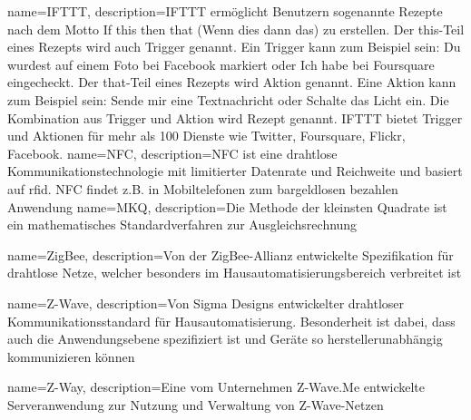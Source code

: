 
{
	name={IFTTT},
	description={IFTTT ermöglicht Benutzern sogenannte \glqq Rezepte\grqq{} nach dem Motto \glqq If this then that\grqq{} (\glqq Wenn dies dann das\grqq) zu erstellen. Der \glqq this\grqq -Teil eines Rezepts wird auch \glqq Trigger\grqq{} genannt. Ein Trigger kann zum Beispiel sein: \glqq Du wurdest auf einem Foto bei Facebook markiert\grqq{} oder \glqq Ich habe bei Foursquare eingecheckt\grqq . Der \glqq that\grqq -Teil eines Rezepts wird Aktion genannt. Eine Aktion kann zum Beispiel sein: \glqq Sende mir eine Textnachricht\grqq{} oder \glqq Schalte das Licht ein\grqq . Die Kombination aus Trigger und Aktion wird Rezept genannt. IFTTT bietet Trigger und Aktionen für mehr als 100 Dienste wie Twitter, Foursquare, Flickr, Facebook.}
}
{
	name={NFC},
	description={NFC ist eine drahtlose Kommunikationstechnologie mit limitierter Datenrate und Reichweite und basiert auf \gls{rfid}. NFC findet z.B. in Mobiltelefonen zum bargeldlosen bezahlen Anwendung}
}
{
	name={MKQ},
	description={Die Methode der kleinsten Quadrate ist ein mathematisches Standardverfahren zur Ausgleichsrechnung}
}




{
	name={ZigBee},
	description={Von der ZigBee-Allianz entwickelte Spezifikation für drahtlose Netze, welcher besonders im Hausautomatisierungsbereich verbreitet ist}
}

{
	name={Z-Wave},
	description={Von Sigma Designs entwickelter drahtloser Kommunikationsstandard für Hausautomatisierung. Besonderheit ist dabei, dass auch die Anwendungsebene spezifiziert ist und Geräte so herstellerunabhängig kommunizieren können}
}

{
	name={Z-Way},
	description={Eine vom Unternehmen Z-Wave.Me entwickelte Serveranwendung zur Nutzung und Verwaltung von Z-Wave-Netzen}
}